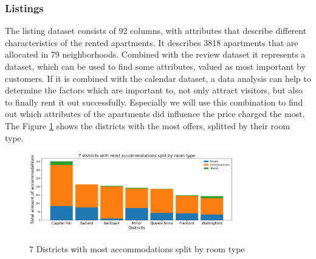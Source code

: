 \subsubsection{Listings}
The listing dataset consists of 92 columns, with attributes that describe different characteristics of the rented apartments. It describes 3818 apartments that are allocated in 79 neighborhoods. Combined with the review dataset it represents a dataset, which can be used to find some attributes, valued as most important by customers. If it is combined with the calendar dataset, a data analysis can help to determine the factors which are important to, not only attract visitors, but also to finally rent it out successfully. Especially we will use this combination to find out which attributes of the apartments did influence the price charged the most. The Figure \ref{districts_room_types} shows the districts with the most offers, splitted by their room type.
%
\begin{figure}
  \begin{center}
  \includegraphics[width=3.5in]{photo/4_most_acc_split_by_roomtype.png}\\
  \caption{7 Districts with most accommodations split by room type}\label{districts_room_types}
  \end{center}
\end{figure}
